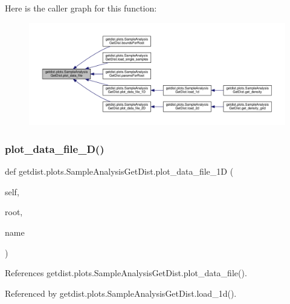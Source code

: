 Here is the caller graph for this function\+:
\nopagebreak
\begin{figure}[H]
\begin{center}
\leavevmode
\includegraphics[width=350pt]{classgetdist_1_1plots_1_1SampleAnalysisGetDist_a286b765eded460a2bdd3327526c0d1e1_icgraph}
\end{center}
\end{figure}
\mbox{\label{classgetdist_1_1plots_1_1SampleAnalysisGetDist_ad510e8bf6d05a25a2da3f5770e5c530f}} 
\subsubsection{\texorpdfstring{plot\+\_\+data\+\_\+file\+\_\+D()}{plot\_data\_file\_1D()}}
{\footnotesize\ttfamily def getdist.\+plots.\+Sample\+Analysis\+Get\+Dist.\+plot\+\_\+data\+\_\+file\+\_\+1D (\begin{DoxyParamCaption}\item[{}]{self,  }\item[{}]{root,  }\item[{}]{name }\end{DoxyParamCaption})}



References getdist.\+plots.\+Sample\+Analysis\+Get\+Dist.\+plot\+\_\+data\+\_\+file().



Referenced by getdist.\+plots.\+Sample\+Analysis\+Get\+Dist.\+load\+\_\+1d().

